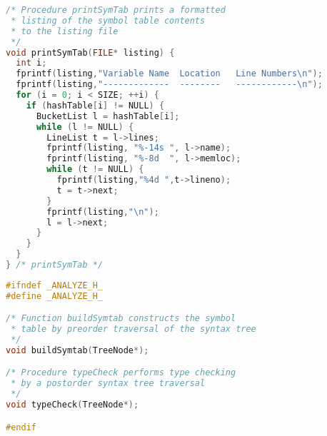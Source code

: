 \documentclass[lang=cn,10pt]{elegantbook}
\begin{document}
\begin{lstlisting}[caption={symtab.c},language=c]
/* Procedure printSymTab prints a formatted 
 * listing of the symbol table contents 
 * to the listing file
 */
void printSymTab(FILE* listing) {
  int i;
  fprintf(listing,"Variable Name  Location   Line Numbers\n");
  fprintf(listing,"-------------  --------   ------------\n");
  for (i = 0; i < SIZE; ++i) {
    if (hashTable[i] != NULL) {
      BucketList l = hashTable[i];
      while (l != NULL) {
        LineList t = l->lines;
        fprintf(listing, "%-14s ", l->name);
        fprintf(listing, "%-8d  ", l->memloc);
        while (t != NULL) {
          fprintf(listing,"%4d ",t->lineno);
          t = t->next;
        }
        fprintf(listing,"\n");
        l = l->next;
      }
    }
  }
} /* printSymTab */
\end{lstlisting}

\begin{lstlisting}[caption={analyze.h},language=c]
#ifndef _ANALYZE_H_
#define _ANALYZE_H_

/* Function buildSymtab constructs the symbol 
 * table by preorder traversal of the syntax tree
 */
void buildSymtab(TreeNode*);

/* Procedure typeCheck performs type checking 
 * by a postorder syntax tree traversal
 */
void typeCheck(TreeNode*);

#endif
\end{lstlisting}
\end{document}
